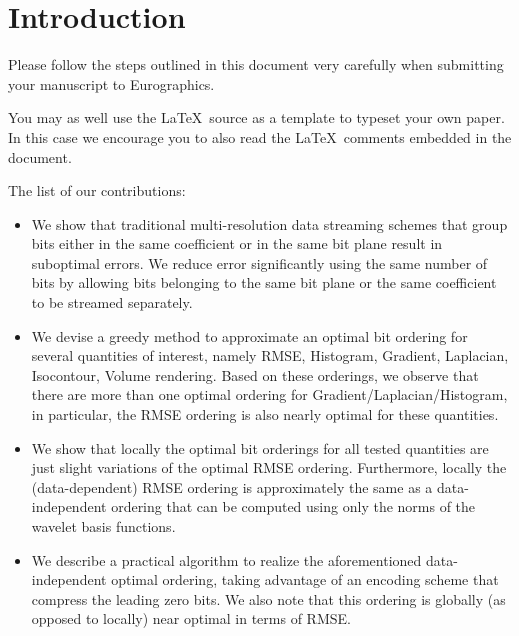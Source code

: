 \section{Introduction}

Please follow the steps outlined in this document very carefully when
submitting your manuscript to Eurographics.

You may as well use the \LaTeX\ source as a template to typeset your own
paper. In this case we encourage you to also read the \LaTeX\ comments
embedded in the document.


The list of our contributions:

\begin{itemize}
        \item We show that traditional multi-resolution data streaming schemes that group bits either in the same coefficient or in the same bit plane result in suboptimal errors. We reduce error significantly using the same number of bits by allowing bits belonging to the same bit plane or the same coefficient to be streamed separately.

        \item We devise a greedy method to approximate an optimal bit ordering for several quantities of interest, namely RMSE, Histogram, Gradient, Laplacian, Isocontour, Volume rendering. Based on these orderings, we observe that there are more than one optimal ordering for Gradient/Laplacian/Histogram, in particular, the RMSE ordering is also nearly optimal for these quantities.

        \item We show that locally the optimal bit orderings for all tested quantities are just slight variations of the optimal RMSE ordering. Furthermore, locally the (data-dependent) RMSE ordering is approximately the same as a data-independent ordering that can be computed using only the norms of the wavelet basis functions.

        \item We describe a practical algorithm to realize the aforementioned data-independent optimal ordering, taking advantage of an encoding scheme that compress the leading zero bits. We also note that this ordering is globally (as opposed to locally) near optimal in terms of RMSE. 
\end{itemize}
